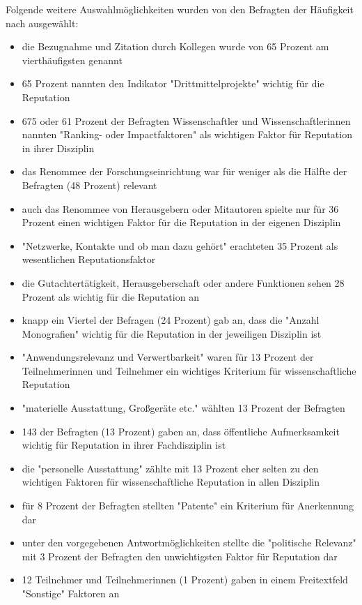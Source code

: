 Folgende weitere Auswahlmöglichkeiten wurden von den Befragten der Häufigkeit nach ausgewählt:
\begin{itemize}
\item die Bezugnahme und Zitation durch Kollegen wurde von 65 Prozent am vierthäufigsten genannt
\item 65 Prozent nannten den Indikator "Drittmittelprojekte" wichtig für die Reputation
\item 675 oder 61 Prozent der Befragten Wissenschaftler und Wissenschaftlerinnen nannten "Ranking- oder Impactfaktoren" als wichtigen Faktor für Reputation in ihrer Disziplin
\item das Renommee der Forschungseinrichtung war für weniger als die Hälfte der Befragten (48 Prozent) relevant
\item auch das Renommee von Herausgebern oder Mitautoren spielte nur für 36 Prozent einen wichtigen Faktor für die Reputation in der eigenen Disziplin
\item "Netzwerke, Kontakte und ob man dazu gehört" erachteten 35 Prozent als wesentlichen Reputationsfaktor
\item die Gutachtertätigkeit, Herausgeberschaft oder andere Funktionen sehen 28 Prozent als wichtig für die Reputation an
\item knapp ein Viertel der Befragen (24 Prozent) gab an, dass die "Anzahl Monografien" wichtig für die Reputation in der jeweiligen Disziplin ist
\item "Anwendungsrelevanz und Verwertbarkeit" waren für 13 Prozent der Teilnehmerinnen und Teilnehmer ein wichtiges Kriterium für wissenschaftliche Reputation
\item "materielle Ausstattung, Großgeräte etc." wählten 13 Prozent der Befragten
\item 143 der Befragten (13 Prozent) gaben an, dass öffentliche Aufmerksamkeit wichtig für Reputation in ihrer Fachdisziplin ist
\item die "personelle Ausstattung" zählte mit 13 Prozent eher selten zu den wichtigen Faktoren für wissenschaftliche Reputation in allen Disziplin
\item für 8 Prozent der Befragten stellten "Patente" ein Kriterium für Anerkennung dar
\item unter den vorgegebenen Antwortmöglichkeiten stellte die "politische Relevanz" mit 3 Prozent der Befragten den unwichtigsten Faktor für Reputation dar
\item 12 Teilnehmer und Teilnehmerinnen (1 Prozent) gaben in einem Freitextfeld "Sonstige" Faktoren an
\end{itemize}


